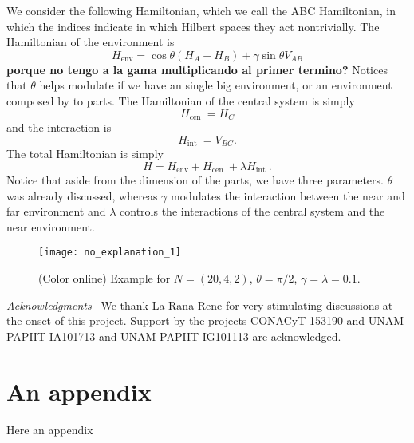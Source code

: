 \documentclass[letterpaper,superscriptaddress,aps,pra,nolongbibliography,nobibnotes,twocolumn,showpacs,groupedaddress,floatfix]{revtex4} %
\def\env{{\textrm{env} }}
\def\cen{{\textrm{cen } }}
\def\inte{{\textrm{int } }}
\begin{document}
We consider the following  Hamiltonian, which we call the ABC Hamiltonian, in
which the indices indicate in which Hilbert spaces they act nontrivially. 
The Hamiltonian of the environment is
\begin{equation}
H_\env= \cos \theta(H_A + H_B) +  \gamma \sin \theta  V_{AB} 
\label{}
\end{equation}
{\bf porque no tengo a la gama multiplicando al primer termino?}
Notices that $\theta$ helps modulate if we have an single big environment, 
or an environment composed by to parts. 
The Hamiltonian of the central system is simply 
\begin{equation}
H_\cen= H_C 
\label{}
\end{equation}
and the interaction is 
\begin{equation}
H_\inte= V_{BC}.
\label{}
\end{equation}
The total Hamiltonian is simply 
\begin{equation}
H = H_\env+ H_\cen +\lambda H_\inte.
\label{}
\end{equation}
Notice that aside from the dimension of the parts, we have three parameters. 
$\theta$ was already discussed, whereas $\gamma$ modulates the interaction 
between the near and far environment and 
$\lambda$ controls the interactions of the central system and the near environment.


\begin{figure} %
\begin{center}
\texttt{[image: no\_explanation\_1]}
\end{center}
\caption{\label{fig:entropy:for:purity} (Color online)  Example for
$N=(20,4,2)$, $\theta = \pi/2$, $\gamma=\lambda=0.1$.}
\end{figure} %



{\em Acknowledgments--}
We thank La Rana Rene for very stimulating discussions at the onset of this project.
Support by the  projects CONACyT 153190 and
UNAM-PAPIIT IA101713 and UNAM-PAPIIT IG101113 are acknowledged.


\appendix
\section{An appendix} %
Here an appendix
\end{document}
